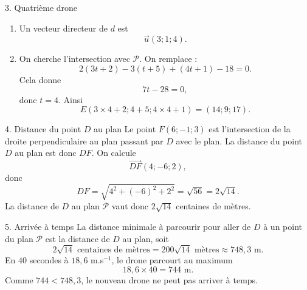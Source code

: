 \documentclass[11pt,a4paper]{article}
\newcommand{\vect}[1]{\overrightarrow{#1}}
\begin{document}
\begin{correctionbox}{3. Quatrième drone}
\begin{enumerate}
\item Un vecteur directeur de $d$ est
\[
\vec u(3;1;4).
\]
\item On cherche l'intersection avec $\mathcal P$. On remplace :
\[
2(3t+2)-3(t+5)+(4t+1)-18=0.
\]
Cela donne
\[
7t-28=0,
\]
donc $t=4$. Ainsi
\[
E(3\times4+2;4+5;4\times4+1)=(14;9;17).
\]
\end{enumerate}
\end{correctionbox}

\begin{correctionbox}{4. Distance du point $D$ au plan}
Le point $F(6;-1;3)$ est l'intersection de la droite perpendiculaire au plan passant par $D$ avec le plan. La distance du point $D$ au plan est donc $DF$.
On calcule
\[
\vect{DF}(4;-6;2),
\]
donc
\[
DF=\sqrt{4^2+(-6)^2+2^2}=\sqrt{56}=2\sqrt{14}.
\]
La distance de $D$ au plan $\mathcal P$ vaut donc $2\sqrt{14}$ centaines de mètres.
\end{correctionbox}

\begin{correctionbox}{5. Arrivée à temps}
La distance minimale à parcourir pour aller de $D$ à un point du plan $\mathcal P$ est la distance de $D$ au plan, soit
\[
2\sqrt{14}\text{ centaines de mètres}=200\sqrt{14}\text{ mètres}\approx 748{,}3\text{ m}.
\]
En $40$ secondes à $18{,}6$ m.s$^{-1}$, le drone parcourt au maximum
\[
18{,}6\times40=744\text{ m}.
\]
Comme $744<748{,}3$, le nouveau drone ne peut pas arriver à temps.
\end{correctionbox}
\end{document}
